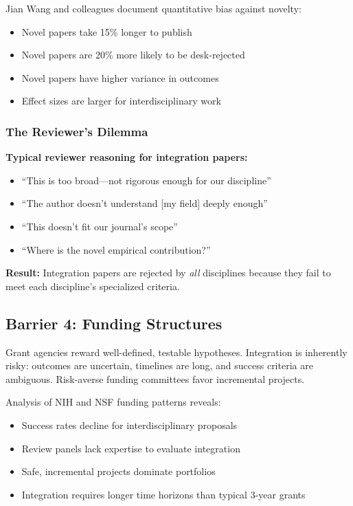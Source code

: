 \documentclass[12pt,a4paper]{article}
\begin{document}
Jian Wang and colleagues document quantitative bias against novelty:
\begin{itemize}
\item Novel papers take 15\% longer to publish
\item Novel papers are 20\% more likely to be desk-rejected
\item Novel papers have higher variance in outcomes
\item Effect sizes are larger for interdisciplinary work
\end{itemize}

\subsubsection{The Reviewer's Dilemma}

\textbf{Typical reviewer reasoning for integration papers:}
\begin{itemize}
\item ``This is too broad---not rigorous enough for our discipline''
\item ``The author doesn't understand [my field] deeply enough''
\item ``This doesn't fit our journal's scope''
\item ``Where is the novel empirical contribution?''
\end{itemize}

\textbf{Result:} Integration papers are rejected by \textit{all} disciplines because they fail to meet each discipline's specialized criteria.

\subsection{Barrier 4: Funding Structures}
\label{sec:barrier4}

Grant agencies reward well-defined, testable hypotheses. Integration is inherently risky: outcomes are uncertain, timelines are long, and success criteria are ambiguous. Risk-averse funding committees favor incremental projects.

Analysis of NIH and NSF funding patterns reveals:
\begin{itemize}
\item Success rates decline for interdisciplinary proposals
\item Review panels lack expertise to evaluate integration
\item Safe, incremental projects dominate portfolios
\item Integration requires longer time horizons than typical 3-year grants
\end{itemize}
\end{document}
